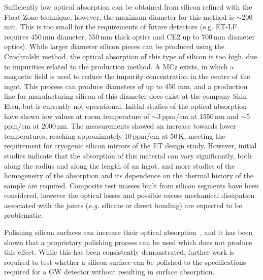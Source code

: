 Sufficiently low optical absorption can be obtained from silicon refined with the Float Zone technique, however, the maximum diameter for this method is $\sim$200\,mm. This is too small for the requirements of future detectors (e.g. \ac{ET-LF} requires 450\,mm diameter, 550\,mm thick optics and \ac{CE2} up to 700\,mm diameter optics). While larger diameter silicon pieces can be produced using the Czochralski method, the optical absorption of this type of silicon is too high, due to impurities related to the production method. A \ac{MCz} exists, in which a magnetic field is used to reduce the impurity concentration in the centre of the ingot. This process can produce diameters of up to 450 mm, and a production line for manufacturing silicon of this diameter does exist at the company Shin Etsu, but is currently not operational. Initial studies of the optical absorption have shown low values at room temperature of $\sim$3\,ppm/cm at 1550\,nm and $\sim$5\,ppm/cm at 2000\,nm. The measurements showed an increase towards lower temperatures, reaching approximately 10\,ppm/cm at 50\,K, meeting the requirement for cryogenic silicon mirrors of the \ac{ET}  design study. However, initial studies indicate that the absorption of this material can vary significantly, both along the radius and along the length of an ingot, and more studies of the homogeneity of the absorption and its dependence on the thermal history of the sample are required. Composite test masses built from silicon segments have been considered, however the optical losses and possible excess mechanical dissipation associated with the joints (\textit{e.g.} silicate or direct bonding) are expected to be problematic.

Polishing silicon surfaces can increase their optical absorption~\cite{SiliconSurfaceAbsorpBell2017}, and it has been shown that a proprietary polishing process can be used which does not produce this effect. 
While this has been consistently demonstrated, further work is required to test whether a silicon surface can be polished to the specifications required for a \ac{GW}   detector without resulting in surface absorption.

